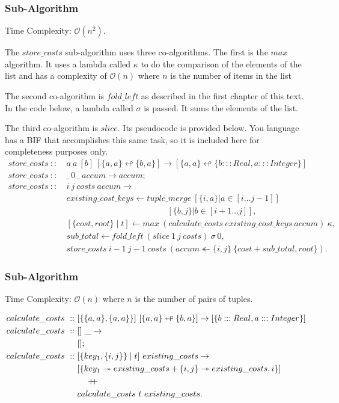 \documentclass[a4paper,10pt]{book}
\newcommand\doubleplus{+\kern-1.3ex+\kern0.8ex}
\newcommand\f{\textit{f}}
\begin{document}
\subsubsection{Sub-Algorithm}
Time Complexity: $\mathcal{O}(n^2)$.

The $store\_costs$ sub-algorithm uses three co-algorithms. The first is the $max$ algorithm. It uses a lambda called $\kappa$ to do the comparison of the elements of the list and has a complexity of $\mathcal{O}(n)$ where $n$ is the number of items in the list

The second co-algorithm is $\f old\_left$ as described in the first chapter of this text. In the code below, a lambda called $\sigma$ is passed. It sums the elements of the list.

The third co-algorithm is $slice$. Its pseudocode is provided below. You language has a BIF that accomplishes this same task, so it is included here for completeness purposes only.
\begin{align*}
store\_costs\ ::\ &a\ a\ [b]\ [\{a,a\}\looparrowleft \{b,a\}]\rightarrow [\{a,a\}\looparrowleft \{b:::Real,a:::Integer\}]\\
store\_costs\ ::\ &\_\ 0\ \_\ accum\rightarrow accum;\\
store\_costs\ ::\ &i\ j\ costs\ accum\rightarrow\\
	&existing\_cost\_keys\leftarrow tuple\_merge\ [\{i,a\}|a\in [i\ldots j-1]]\\
	&\qquad\qquad\qquad\qquad\qquad\qquad [\{b,j\}|b\in[i+1\ldots j]],\\
	&[\{cost,root\}\mid t]\leftarrow max\ (calculate\_costs\ existing\_cost\_keys\ accum)\ \kappa,\\
	&sub\_total\leftarrow \f old\_left\ (slice\ 1\ j\ costs)\ \sigma\ 0,\\
	&store\_costs\ i-1\ j-1\ costs\ (accum\twoheadleftarrow \{i,j\}\ \{cost + sub\_total,root\}).
\end{align*}

\subsubsection{Sub-Algorithm}
Time Complexity: $\mathcal{O}(n)$ where $n$ is the number of pairs of tuples.

\begin{align*}
calculate\_costs\ ::\ & [\{\{a,a\},\{a,a\}\}]\ [\{a,a\}\looparrowleft \{b,a\}]\rightarrow [\{b:::Real,a:::Integer\}]\\
calculate\_costs\ ::\ &[]\ \_\rightarrow\\
	&[];\\
calculate\_costs\ ::\ &[\{key_1,\{i,j\}\}\mid t]\ existing\_costs\rightarrow\\
	&[\{key_1\twoheadrightarrow existing\_costs + \{i,j\}\twoheadrightarrow existing\_costs,i\}]\\
	&\quad\doubleplus\\
	&calculate\_costs\ t\ existing\_costs.
\end{align*}
\end{document}
